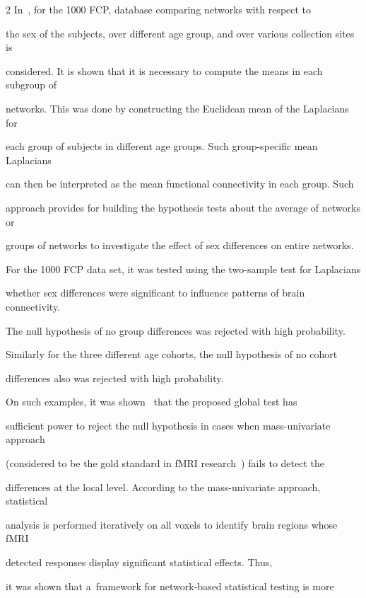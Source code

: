 \begin{multicols}{2}
  In~\cite{64-kl},  for the 1000 FCP, database comparing networks with respect to


the sex of the subjects, over different age group, and over various collection sites is


considered. It is shown that it is necessary to compute the means in each subgroup of


networks. This was done by constructing the Euclidean mean of the Laplacians for


each group of subjects in different age groups. Such group-specific mean Laplacians


can then be interpreted as the mean functional connectivity in each group. Such


approach provides for building the hypothesis tests about the average of networks or


groups of networks to investigate the effect of sex differences on entire networks.





  For the 1000 FCP data set, it was tested using the two-sample test for Laplacians


whether sex differences were significant to influence patterns of brain connectivity.


The null hypothesis of no group differences was rejected with high probability.


Similarly for the three different age cohorts, the null hypothesis of no cohort


differences also was rejected with high probability.





  On such examples, it was shown~\cite{64-kl} that the proposed global test has


sufficient power to reject the null hypothesis in cases when mass-univariate approach


(considered to be the gold standard in fMRI research~\cite{70-kl}) fails to detect the


differences at the local level. According to the mass-univariate approach, statistical


analysis is performed iteratively on all voxels to identify brain regions whose fMRI


detected responses display significant statistical effects. Thus,


it was shown that a~framework for network-based statistical testing is more



\end{multicols}
